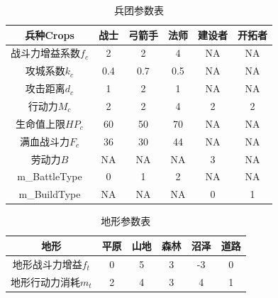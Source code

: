 \documentclass[a4paper,4pt]{article}
\begin{document}
\begin{table}[htbp]
  \centering
  \caption{兵团参数表}
  \begin{tabular}{c|c|c|c|c|c}
    \hline
    兵种Crops           & 战士 & 弓箭手 & 法师 & 建设者 & 开拓者 \bigstrut \\
    \hline
    战斗力增益系数$f_c$ & 2    & 2      & 4    & NA     & NA \bigstrut     \\
    \hline
    攻城系数$k_c$       & 0.4  & 0.7    & 0.5  & NA     & NA \bigstrut     \\
    \hline
    攻击距离$d_c$       & 1    & 2      & 1    & NA     & NA \bigstrut     \\
    \hline
    行动力$M_c$         & 2    & 2      & 4    & 2      & 2 \bigstrut      \\
    \hline
    生命值上限$HP_c$    & 60   & 50     & 70   & NA     & NA \bigstrut     \\
    \hline
    满血战斗力$F_c$     & 36   & 30     & 44   & NA     & NA \bigstrut     \\
    \hline
    劳动力$B$           & NA   & NA     & NA   & 3      & NA \bigstrut     \\
    \hline
    m\_BattleType       & 0    & 1      & 2    & NA     & NA \bigstrut     \\
    \hline
    m\_BuildType        & NA   & NA     & NA   & 0      & 1 \bigstrut      \\
    \hline
  \end{tabular}%
  \label{兵团}%
\end{table}%

\begin{table}[htbp]
  \centering
  \caption{地形参数表}
  \begin{tabular}{c|c|c|c|c|c}
    \hline
    地形                & 平原 & 山地 & 森林 & 沼泽 & 道路 \bigstrut \\
    \hline
    地形战斗力增益$f_t$ & 0    & 5    & 3    & -3   & 0 \bigstrut    \\
    \hline
    地形行动力消耗$m_t$ & 2    & 4    & 3    & 4    & 1 \bigstrut    \\
    \hline
  \end{tabular}%
  \label{地形}%
\end{table}%
\end{document}
